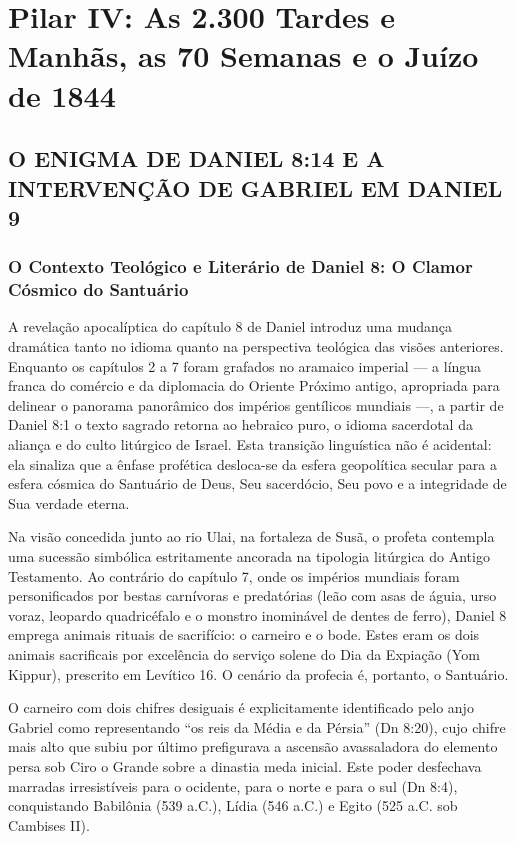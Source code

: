 \chapter{Pilar IV: As 2.300 Tardes e Manhãs, as 70 Semanas e o Juízo de 1844}






\section{O ENIGMA DE DANIEL 8:14 E A INTERVENÇÃO DE GABRIEL EM DANIEL 9}



\subsection{O Contexto Teológico e Literário de Daniel 8: O Clamor Cósmico do Santuário}


A revelação apocalíptica do capítulo 8 de Daniel introduz uma mudança dramática tanto no idioma quanto na perspectiva teológica das visões anteriores. Enquanto os capítulos 2 a 7 foram grafados no aramaico imperial — a língua franca do comércio e da diplomacia do Oriente Próximo antigo, apropriada para delinear o panorama panorâmico dos impérios gentílicos mundiais —, a partir de Daniel 8:1 o texto sagrado retorna ao hebraico puro, o idioma sacerdotal da aliança e do culto litúrgico de Israel. Esta transição linguística não é acidental: ela sinaliza que a ênfase profética desloca-se da esfera geopolítica secular para a esfera cósmica do Santuário de Deus, Seu sacerdócio, Seu povo e a integridade de Sua verdade eterna.

Na visão concedida junto ao rio Ulai, na fortaleza de Susã, o profeta contempla uma sucessão simbólica estritamente ancorada na tipologia litúrgica do Antigo Testamento. Ao contrário do capítulo 7, onde os impérios mundiais foram personificados por bestas carnívoras e predatórias (leão com asas de águia, urso voraz, leopardo quadricéfalo e o monstro inominável de dentes de ferro), Daniel 8 emprega animais rituais de sacrifício: o carneiro e o bode. Estes eram os dois animais sacrificais por excelência do serviço solene do Dia da Expiação (Yom Kippur), prescrito em Levítico 16. O cenário da profecia é, portanto, o Santuário.

O carneiro com dois chifres desiguais é explicitamente identificado pelo anjo Gabriel como representando ``os reis da Média e da Pérsia'' (Dn 8:20), cujo chifre mais alto que subiu por último prefigurava a ascensão avassaladora do elemento persa sob Ciro o Grande sobre a dinastia meda inicial. Este poder desfechava marradas irresistíveis para o ocidente, para o norte e para o sul (Dn 8:4), conquistando Babilônia (539 a.C.), Lídia (546 a.C.) e Egito (525 a.C. sob Cambises II).

